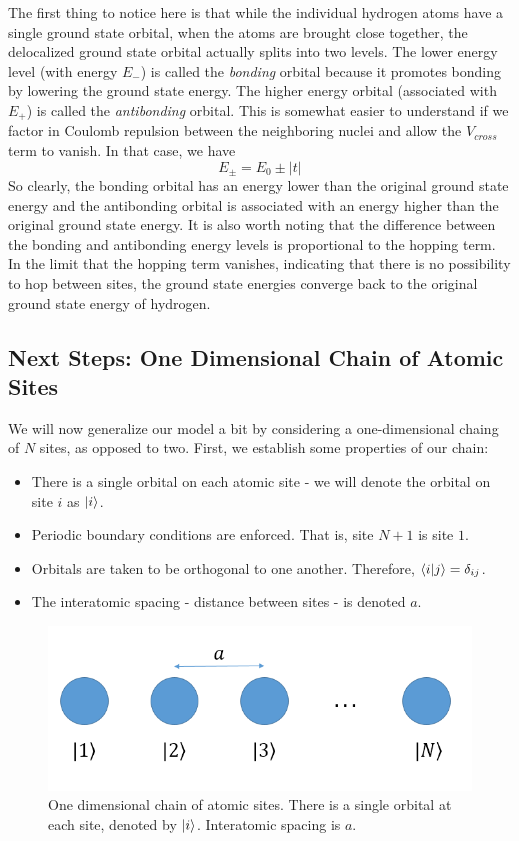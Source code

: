 \documentclass{article}
\begin{document}
The first thing to notice here is that while the individual hydrogen atoms have a single ground state orbital, when the atoms are brought close together, the delocalized ground state orbital actually splits into two levels.
The lower energy level (with energy $E_{-}$) is called the \emph{bonding} orbital because it promotes bonding by lowering the ground state energy. The higher energy orbital (associated with $E_{+}$) is called the \emph{antibonding} orbital. This is somewhat easier to understand
if we factor in Coulomb repulsion between the neighboring nuclei and allow the $V_{cross}$ term to vanish. In that case, we have
$$ E_{\pm} = E_{0} \pm |t| $$
So clearly, the bonding orbital has an energy lower than the original ground state energy and the antibonding orbital is associated with an energy higher than the original ground state energy. It is also worth noting that the difference between the bonding and antibonding energy levels is
proportional to the hopping term. In the limit that the hopping term vanishes, indicating that there is no possibility to hop between sites, the ground state energies converge back to the original ground state energy of hydrogen.

\subsection{Next Steps: One Dimensional Chain of Atomic Sites}
We will now generalize our model a bit by considering a one-dimensional chaing of $N$ sites, as opposed to two. First, we establish some properties of
our chain:
\begin{itemize}
\item There is a single orbital on each atomic site -  we will denote the orbital on site $i$ as $\ket{i}$.
\item Periodic boundary conditions are enforced. That is, site $N+1$ is site $1$.
\item Orbitals are taken to be orthogonal to one another. Therefore, $\bra{i}\ket{j} = \delta_{ij}$.
\item The interatomic spacing - distance between sites - is denoted $a$.
\end{itemize}

\begin{figure}[h]
\centering
\includegraphics[scale=.5]{figure_6}
\caption{One dimensional chain of atomic sites. There is a single orbital at each site, denoted by $\ket{i}$. Interatomic spacing is $a$.}
\end{figure}
\end{document}
